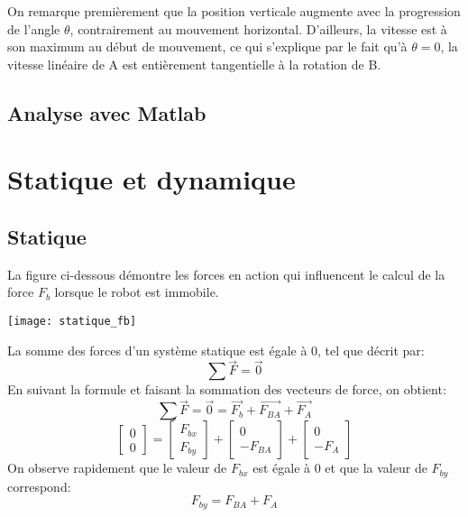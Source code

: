 \documentclass{udes_rapport} %
\begin{document}
On remarque premièrement que la position verticale augmente avec la progression de l'angle $\theta$, contrairement au mouvement horizontal.
D'ailleurs, la vitesse est à son maximum au début de mouvement, ce qui s'explique par le fait qu'à $\theta=0$, 
la vitesse linéaire de A est entièrement tangentielle à la rotation de B.

\subsection{Analyse avec Matlab}


\section{Statique et dynamique}
\subsection{Statique}
La figure ci-dessous démontre les forces en action qui influencent le calcul de la force $F_b$ lorsque le robot est immobile.
\begin{center}
	\centering
	\texttt{[image: statique\_fb]}
	\label{statique_fb}
\end{center}
La somme des forces d'un système statique est égale à 0, tel que décrit par:
\begin{equation}
	\sum \overrightarrow F = \overrightarrow 0
\end{equation}
En suivant la formule et faisant la sommation des vecteurs de force, on obtient:
	\[	\sum \overrightarrow F = \overrightarrow 0 = \overrightarrow{F_b} + \overrightarrow{F_{BA}} + \overrightarrow{F_A}	\]
	\[	\begin{bmatrix}
	0\\ 
	0
	\end{bmatrix} = \begin{bmatrix}
	F_{bx}\\ 
	F_{by}
	\end{bmatrix} + \begin{bmatrix}
	0\\ 
	-F_{BA}
	\end{bmatrix} + \begin{bmatrix}
	0\\ 
	-F_A
	\end{bmatrix}	\]
On observe rapidement que le valeur de $F_{bx}$ est égale à 0 et que la valeur de $F_{by}$ correspond:
	\[	F_{by} = F_{BA} + F_A 	\]
\end{document}
